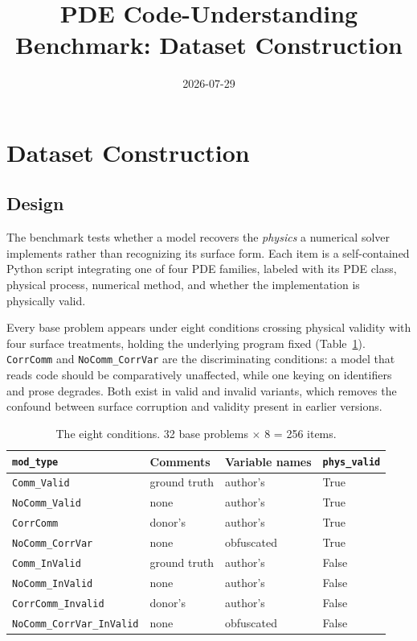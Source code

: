 \documentclass[11pt]{article}
\title{PDE Code-Understanding Benchmark: Dataset Construction}
\date{2026-07-29}
\begin{document}
\maketitle

\section{Dataset Construction}
\label{app:dataset}

\subsection{Design}

The benchmark tests whether a model recovers the \emph{physics} a numerical solver
implements rather than recognizing its surface form. Each item is a self-contained Python
script integrating one of four PDE families, labeled with its PDE class, physical process,
numerical method, and whether the implementation is physically valid.

Every base problem appears under eight conditions crossing physical validity with four
surface treatments, holding the underlying program fixed (Table~\ref{tab:modtypes}).
\texttt{CorrComm} and \texttt{NoComm\_CorrVar} are the discriminating conditions: a model
that reads code should be comparatively unaffected, while one keying on identifiers and prose
degrades. Both exist in valid and invalid variants, which removes the confound between
surface corruption and validity present in earlier versions.

\begin{table}[h]
\centering
\small
\begin{tabular}{@{}llll@{}}
\toprule
\texttt{mod\_type} & Comments & Variable names & \texttt{phys\_valid} \\
\midrule
\texttt{Comm\_Valid}              & ground truth & author's   & True \\
\texttt{NoComm\_Valid}            & none         & author's   & True \\
\texttt{CorrComm}                 & donor's      & author's   & True \\
\texttt{NoComm\_CorrVar}          & none         & obfuscated & True \\
\texttt{Comm\_InValid}            & ground truth & author's   & False \\
\texttt{NoComm\_InValid}          & none         & author's   & False \\
\texttt{CorrComm\_Invalid}        & donor's      & author's   & False \\
\texttt{NoComm\_CorrVar\_InValid} & none         & obfuscated & False \\
\bottomrule
\end{tabular}
\caption{The eight conditions. 32 base problems $\times$ 8 = 256 items.}
\label{tab:modtypes}
\end{table}
\end{document}
